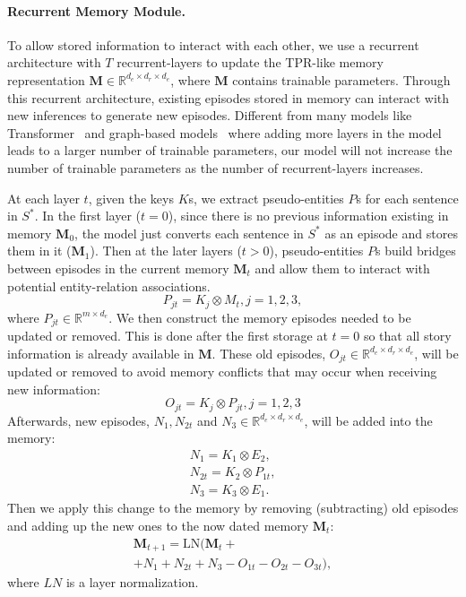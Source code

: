 \documentclass[letterpaper]{article} \usepackage{aaai22}  \usepackage{times}  \usepackage{helvet}  \usepackage{courier}  \usepackage[hyphens]{url}  \usepackage{graphicx} \urlstyle{rm} \def\UrlFont{\rm}  \usepackage{natbib}  \usepackage{caption} \DeclareCaptionStyle{ruled}{labelfont=normalfont,labelsep=colon,strut=off} \frenchspacing  \setlength{\pdfpagewidth}{8.5in}  \setlength{\pdfpageheight}{11in}  \usepackage{algorithm}
\begin{document}
\paragraph{Recurrent Memory Module.} To allow stored information to interact with each other, we use a recurrent architecture with $T$ recurrent-layers to update the TPR-like memory representation $\boldsymbol{M} \in \mathbb{R}^{d_e \times d_r \times d_e}$, where $\boldsymbol{M}$ contains trainable parameters. 
Through this recurrent architecture, existing episodes stored in memory can interact with new inferences to generate new episodes.
Different from many models like Transformer~\cite{vaswani2017attention} and graph-based models~\cite{kipf2016semi, velivckovic2017graph} where adding more layers in the model leads to a larger number of trainable parameters, our model will not increase the number of trainable parameters as the number of recurrent-layers increases.

At each layer $t$, given the keys $K$s, we extract pseudo-entities $P$s for each sentence in $S^*$. 
In the first layer ($t=0$), since there is no previous information existing in memory $\boldsymbol{M}_0$, the model just converts each sentence in $S^*$ as an episode and stores them in it ($\boldsymbol{M}_{1}$).
Then at the later layers ($t>0$), pseudo-entities $P$s build bridges between episodes in the current memory $\boldsymbol{M}_t$ and allow them to interact with potential entity-relation associations.
\begin{equation}P_{jt} = K_j \otimes M_t,  j=1,2,3,
\end{equation}
where $P_{jt} \in \mathbb{R}^{m \times d_e}$.
We then construct the memory episodes needed to be updated or removed. This is done after the first storage at $t=0$ so that all story information is already available in $\boldsymbol{M}$. 
These old episodes, $O_{jt} \in \mathbb{R}^{d_e \times d_r \times d_e}$, will be updated or removed to avoid memory conflicts that may occur when receiving new information:
\begin{equation}O_{jt} = K_j \otimes P_{jt},  j=1,2,3
\end{equation}
Afterwards, new episodes, $N_1, N_{2t}$ and $N_3 \in \mathbb{R}^{d_e \times d_r \times d_e}$, will be added into the memory:
\begin{align}
    N_1 = K_1 \otimes E_2, \\
    N_{2t} = K_2 \otimes P_{1t}, \\
    N_3 = K_3 \otimes E_1. 
\end{align}
Then we apply this change to the memory by removing (subtracting) old episodes and adding up the new ones to the now dated memory $\boldsymbol{M}_t$:
\begin{multline}
    \boldsymbol{M}_{t+1}=\text{LN}(\boldsymbol{M}_{t}+\\
    +N_1+N_{2t}+N_3-O_{1t}-O_{2t}-O_{3t}),
\end{multline}
where $LN$ is a layer normalization. 
\end{document}
